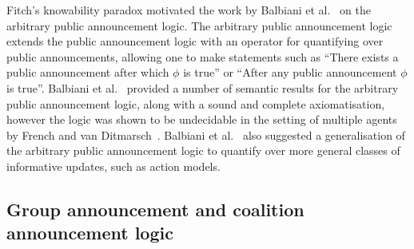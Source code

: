 Fitch's knowability paradox motivated the work by Balbiani et al.~\cite{balbiani:2007} on the arbitrary public announcement logic.
The arbitrary public announcement logic extends the public announcement logic with an operator for quantifying over public announcements, allowing one to make statements such as ``There exists a public announcement after which $\phi$ is true'' or ``After any public announcement $\phi$ is true''.
Balbiani et al.~\cite{balbiani:2007} provided a number of semantic results for the arbitrary public announcement logic, along with a sound and complete axiomatisation, however the logic was shown to be undecidable in the setting of multiple agents by French and van Ditmarsch~\cite{french:2008}.
Balbiani et al.~\cite{balbiani:2007} also suggested a generalisation of the arbitrary public announcement logic to quantify over more general classes of informative updates, such as action models.


\subsection{Group announcement and coalition announcement logic}


